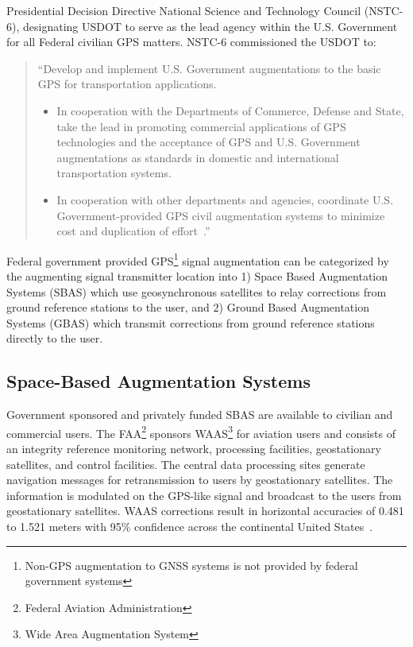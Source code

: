 Presidential Decision Directive National Science and Technology Council (NSTC-6), designating USDOT to serve as the lead agency within the U.S. Government for all Federal civilian GPS matters. NSTC-6 commissioned the USDOT to:
\begin{quotation}
``Develop and implement U.S. Government augmentations to the basic GPS for transportation applications.
\begin{itemize}
\firmlist
	\item In cooperation with the Departments of Commerce, Defense and State, take the lead in promoting commercial applications of GPS technologies and the acceptance of GPS and U.S. Government augmentations as standards in domestic and international transportation systems.
	\item In cooperation with other departments and agencies, coordinate U.S. Government-provided GPS civil augmentation systems to minimize cost and duplication of effort~\citep{1996NSTC-6}.''
\end{itemize}
\end{quotation}

Federal government provided GPS\footnote{Non-GPS augmentation to GNSS systems is not provided by federal government systems} signal augmentation can be categorized by the augmenting signal transmitter location into 1) Space Based Augmentation Systems (SBAS) which use geosynchronous satellites to relay corrections from ground reference stations to the user, and 2) Ground Based Augmentation Systems (GBAS) which transmit corrections from ground reference stations directly to the user.

\subsection{Space-Based Augmentation Systems}
Government sponsored and privately funded SBAS are available to civilian and commercial users. The FAA\footnote{Federal Aviation Administration} sponsors WAAS\footnote{Wide Area Augmentation System} for aviation users and consists of an integrity reference monitoring network, processing facilities, geostationary satellites, and control facilities. The central data processing sites generate navigation messages for retransmission to users by geostationary satellites. The information is modulated on the GPS-like signal and broadcast to the users from geostationary satellites. WAAS corrections result in horizontal accuracies of 0.481 to 1.521 meters with 95\% confidence across the continental United States~\citep{WAAS09}.

